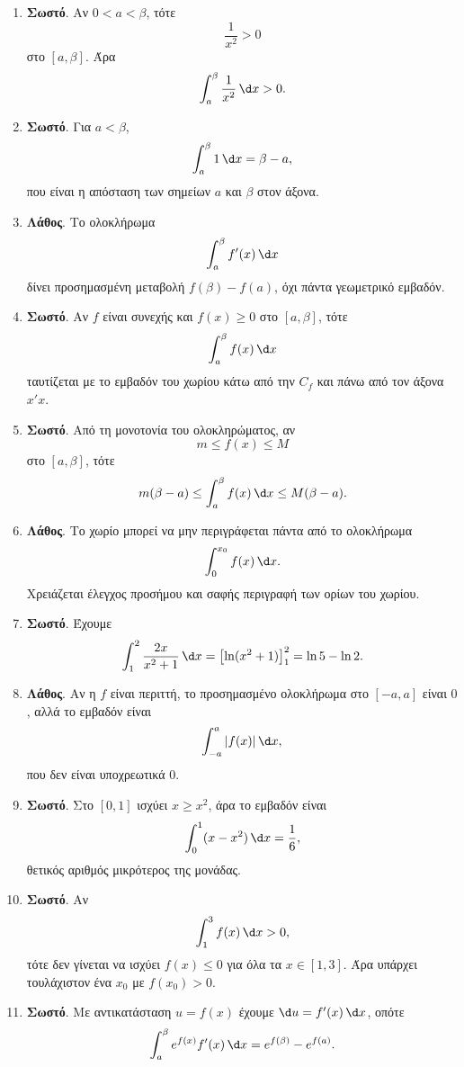 \begin{enumerate}[label=\textbf{3.\arabic*.}]
\item \textbf{Σωστό}. Αν $0<a<\beta$, τότε
\[
\frac{1}{x^2}>0
\]
στο $[a,\beta]$. Άρα
\[
\dint_a^\beta \frac{1}{x^2}\,\d x>0.
\]

\item \textbf{Σωστό}. Για $a<\beta$,
\[
\dint_a^\beta 1\,\d x=\beta-a,
\]
που είναι η απόσταση των σημείων $a$ και $\beta$ στον άξονα.

\item \textbf{Λάθος}. Το ολοκλήρωμα
\[
\dint_a^\beta f'(x)\,\d x
\]
δίνει προσημασμένη μεταβολή $f(\beta)-f(a)$, όχι πάντα γεωμετρικό εμβαδόν.

\item \textbf{Σωστό}. Αν $f$ είναι συνεχής και $f(x)\geq0$ στο $[a,\beta]$, τότε
\[
\dint_a^\beta f(x)\,\d x
\]
ταυτίζεται με το εμβαδόν του χωρίου κάτω από την $C_f$ και πάνω από τον άξονα $x'x$.

\item \textbf{Σωστό}. Από τη μονοτονία του ολοκληρώματος, αν
\[
m\leq f(x)\leq M
\]
στο $[a,\beta]$, τότε
\[
m(\beta-a)\leq\dint_a^\beta f(x)\,\d x\leq M(\beta-a).
\]

\item \textbf{Λάθος}. Το χωρίο μπορεί να μην περιγράφεται πάντα από το ολοκλήρωμα
\[
\dint_0^{x_0} f(x)\,\d x.
\]
Χρειάζεται έλεγχος προσήμου και σαφής περιγραφή των ορίων του χωρίου.

\item \textbf{Σωστό}. Έχουμε
\[
\dint_1^2 \frac{2x}{x^2+1}\,\d x
=\left[\ln(x^2+1)\right]_1^2
=\ln5-\ln2.
\]

\item \textbf{Λάθος}. Αν η $f$ είναι περιττή, το προσημασμένο ολοκλήρωμα στο $[-a,a]$ είναι $0$, αλλά το εμβαδόν είναι
\[
\dint_{-a}^a |f(x)|\,\d x,
\]
που δεν είναι υποχρεωτικά $0$.

\item \textbf{Σωστό}. Στο $[0,1]$ ισχύει $x\geq x^2$, άρα το εμβαδόν είναι
\[
\dint_0^1 (x-x^2)\,\d x=\frac16,
\]
θετικός αριθμός μικρότερος της μονάδας.

\item \textbf{Σωστό}. Αν
\[
\dint_1^3 f(x)\,\d x>0,
\]
τότε δεν γίνεται να ισχύει $f(x)\leq0$ για όλα τα $x\in[1,3]$. Άρα υπάρχει τουλάχιστον ένα $x_0$ με $f(x_0)>0$.

\item \textbf{Σωστό}. Με αντικατάσταση $u=f(x)$ έχουμε $\d u=f'(x)\,\d x$, οπότε
\[
\dint_a^\beta e^{f(x)}f'(x)\,\d x
=e^{f(\beta)}-e^{f(a)}.
\]


\end{enumerate}
